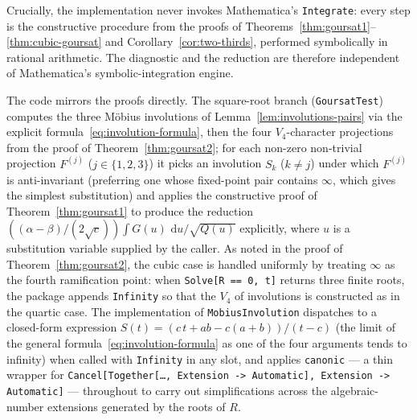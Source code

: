 \documentclass[11pt,a4paper]{article}
\theoremstyle{plain}
\theoremstyle{definition}
\theoremstyle{remark}
\renewcommand{\d}{\,\mathrm{d}}
\begin{document}
Crucially, the implementation never invokes Mathematica's \texttt{Integrate}: every step is the constructive procedure from the proofs of Theorems~\ref{thm:goursat1}--\ref{thm:cubic-goursat} and Corollary~\ref{cor:two-thirds}, performed symbolically in rational arithmetic. The diagnostic and the reduction are therefore independent of Mathematica's symbolic-integration engine.

The code mirrors the proofs directly. The square-root branch (\texttt{GoursatTest}) computes the three M\"obius involutions of Lemma~\ref{lem:involutions-pairs} via the explicit formula~\eqref{eq:involution-formula}, then the four $V_4$-character projections from the proof of Theorem~\ref{thm:goursat2}; for each non-zero non-trivial projection $F^{(j)}$ ($j\in\{1,2,3\}$) it picks an involution $S_k$ ($k\neq j$) under which $F^{(j)}$ is anti-invariant (preferring one whose fixed-point pair contains $\infty$, which gives the simplest substitution) and applies the constructive proof of Theorem~\ref{thm:goursat1} to produce the reduction $((\alpha-\beta)/(2\sqrt{c}))\int G(u)\,\d u/\sqrt{Q(u)}$ explicitly, where $u$ is a substitution variable supplied by the caller. As noted in the proof of Theorem~\ref{thm:goursat2}, the cubic case is handled uniformly by treating $\infty$ as the fourth ramification point: when \texttt{Solve[R == 0, t]} returns three finite roots, the package appends \texttt{Infinity} so that the $V_4$ of involutions is constructed as in the quartic case. The implementation of \texttt{MobiusInvolution} dispatches to a closed-form expression $S(t) = (c\,t + ab - c(a+b))/(t-c)$ (the limit of the general formula~\eqref{eq:involution-formula} as one of the four arguments tends to infinity) when called with \texttt{Infinity} in any slot, and applies \texttt{canonic} --- a thin wrapper for \texttt{Cancel[Together[\dots, Extension -> Automatic], Extension -> Automatic]} --- throughout to carry out simplifications across the algebraic-number extensions generated by the roots of $R$.
\end{document}
